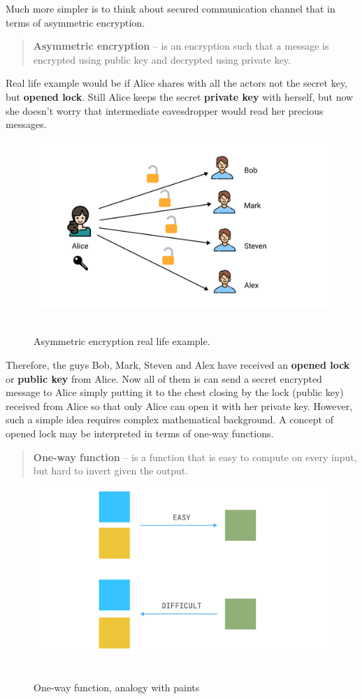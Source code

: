 Much more simpler is to think about secured communication channel that in terms of asymmetric encryption.
\begin{quote}
    \textbf{Asymmetric encryption} -- is an encryption such that a message is encrypted using public key and
    decrypted using private key.
\end{quote}
Real life example would be if Alice shares with all the actors not the secret key, but \textbf{opened lock}.
Still Alice keeps the secret \textbf{private key} with herself,
but now she doesn't worry that intermediate eavesdropper would read her precious messages.
\begin{figure}[H]
    \centering
    \includegraphics[width=1.15\textwidth]{img/Asymmetric_encryption}
    ~\caption{Asymmetric encryption real life example.} \label{fig:asymmetric-encryption}
\end{figure}
Therefore, the guys Bob, Mark, Steven and Alex have received an \textbf{opened lock} or \textbf{public key} from Alice.
Now all of them is can send a secret encrypted message to Alice simply putting it to the chest closing by the lock (public key)
received from Alice so that only Alice can open it with her private key.
However, such a simple idea requires complex mathematical background.
A concept of opened lock may be interpreted in terms of one-way functions.
\begin{quote}
    \textbf{One-way function} -- is a function that is easy to compute on every input, but hard to invert given the output.
\end{quote}

\begin{figure}[H]
    \centering
    \includegraphics[width=1\textwidth]{img/One_Way_Functions}
    ~\caption{One-way function, analogy with paints}
    \label{fig:one-way-function}
\end{figure}
